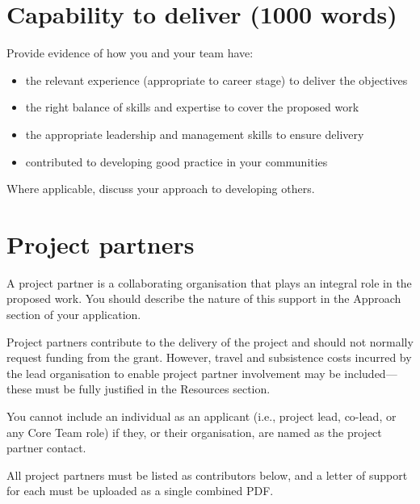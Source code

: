 \documentclass[12pt]{article}
\newenvironment{instruction}{%
    \begin{tcolorbox}[colback=red!5,colframe=red,title=Instruction]%
}{%
    \end{tcolorbox}%
}
\begin{document}
\section{Capability to deliver (1000 words)}

\begin{instruction}
Provide evidence of how you and your team have:

    \begin{itemize}
        \item the relevant experience (appropriate to career stage) to deliver the objectives
        \item the right balance of skills and expertise to cover the proposed work
        \item the appropriate leadership and management skills to ensure delivery
        \item contributed to developing good practice in your communities
    \end{itemize}

Where applicable, discuss your approach to developing others.

\end{instruction}



\pagebreak

\section{Project partners}

\begin{instruction}

A project partner is a collaborating organisation that plays an integral role in the proposed work. You should describe the nature of this support in the Approach section of your application.

Project partners contribute to the delivery of the project and should not normally request funding from the grant. However, travel and subsistence costs incurred by the lead organisation to enable project partner involvement may be included—these must be fully justified in the Resources section.

You cannot include an individual as an applicant (i.e., project lead, co-lead, or any Core Team role) if they, or their organisation, are named as the project partner contact.

All project partners must be listed as contributors below, and a letter of support for each must be uploaded as a single combined PDF.

\end{instruction}
\end{document}
